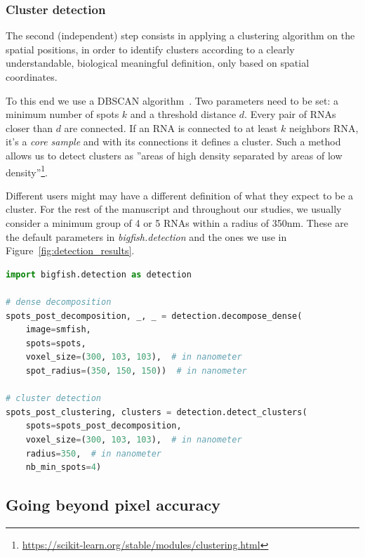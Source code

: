 \subsubsection{Cluster detection}

The second (independent) step consists in applying a clustering algorithm on the spatial positions, in order to identify clusters according to a clearly understandable, biological meaningful definition, only based on spatial coordinates. 

To this end we use a DBSCAN algorithm~\cite{ester_density-based_1996, scikit-learn}.
Two parameters need to be set: a minimum number of spots $k$ and a threshold distance $d$.
Every pair of \ac{RNA}s closer than $d$ are connected.
If an \ac{RNA} is connected to at least $k$ neighbors \ac{RNA}, it's a \emph{core sample} and with its connections it defines a cluster.
Such a method allows us to detect clusters as ''areas of high density separated by areas of low density''\footnote{\url{https://scikit-learn.org/stable/modules/clustering.html}}.

Different users might may have a different definition of what they expect to be a cluster.
For the rest of the manuscript and throughout our studies, we usually consider a minimum group of 4 or 5 \ac{RNA}s within a radius of 350nm.
These are the default parameters in \emph{bigfish.detection} and the ones we use in Figure~\ref{fig:detection_results}.\\

\begin{minipage}{0.9\textwidth}
\begin{lstlisting}[language=Python]
import bigfish.detection as detection

# dense decomposition
spots_post_decomposition, _, _ = detection.decompose_dense(
    image=smfish,
    spots=spots,
    voxel_size=(300, 103, 103),  # in nanometer
    spot_radius=(350, 150, 150))  # in nanometer

# cluster detection
spots_post_clustering, clusters = detection.detect_clusters(
    spots=spots_post_decomposition,
    voxel_size=(300, 103, 103),  # in nanometer
    radius=350,  # in nanometer
    nb_min_spots=4)
\end{lstlisting}
\end{minipage}

\subsection{Going beyond pixel accuracy}
\label{subsec:subpixel}

